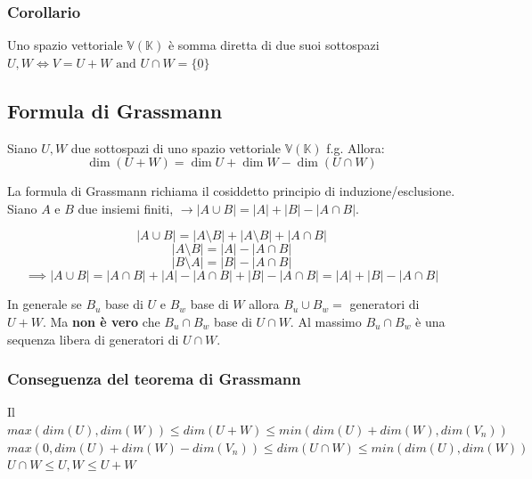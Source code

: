 \documentclass{article}
\newcommand{\V}{\mathbb{V} (\mathbb{K})}
\begin{document}
\subsubsection{Corollario}
Uno spazio vettoriale $\V$ è somma diretta di due suoi sottospazi $U, W \iff{V}
    = U+W \text{ and } U \cap{W} = \{\underbar{0}\}$

\subsection{Formula di Grassmann}
Siano $U, W$ due sottospazi di uno spazio vettoriale $\V$ f.g. Allora:
\[
    \dim(U+W) = \dim U + \dim W - \dim(U\cap W)
\]

La formula di Grassmann richiama il cosiddetto principio di
induzione/esclusione. Siano $A$ e $B$ due insiemi finiti, $\rightarrow |A \cup
    B| = |A| + |B| - |A\cap B|$.

\begin{minipage}{0.2\textwidth}
\end{minipage}%
\begin{minipage}{0.4\textwidth}
    \[
        |A\cup B| = |A\setminus B| + |A\setminus B| + |A\cap B|\]
    \[
        |A\setminus B| = |A| - |A\cap B|
    \]
    \[
        |B\setminus A| = |B| - |A\cap B|
    \]
    \[
        \implies |A\cup B| = |A\cap B| + |A| - |A\cap B| + |B| - |A\cap B| = |A| + |B| - |A\cap B|
    \]
    \vspace{2pt}
\end{minipage}

In generale se $B_u$ base di $U$ e $B_w$ base di $W$ allora $B_u\cup B_w = $
generatori di $U+W$. Ma \textbf{non è vero} che $B_u\cap B_w$ base di $U\cap
    W$. Al massimo $B_u\cap B_w$ è una sequenza libera di generatori di $U\cap W$.

\subsubsection{Conseguenza del teorema di Grassmann}
Il $max(dim (U), dim (W))\leq dim(U+W)\leq min (dim (U)+dim (W), dim (V_n))$\\
$max (0, dim (U) + dim (W) - dim(V_n))\leq dim (U\cap W)\leq min (dim (U), dim
    (W))$ \\ $U\cap W\leq U, W\leq U+W$
\end{document}
